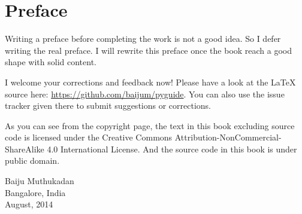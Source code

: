 \cleardoublepage
{}
{}
\chapter*{Preface}

Writing a preface before completing the work is not a good idea.  So I
defer writing the real preface.  I will rewrite this preface once the
book reach a good shape with solid content.

I welcome your corrections and feedback now!  Please have a look at
the \LaTeX{} source here: \url{https://github.com/baijum/pyguide}.  You
can also use the issue tracker given there to submit suggestions or
corrections.

As you can see from the copyright page, the text in this book
excluding source code is licensed under the Creative Commons
Attribution-NonCommercial-ShareAlike 4.0 International License.  And
the source code in this book is under public domain.

\vspace*{.5in}
Baiju Muthukadan\\
Bangalore, India\\
August, 2014
